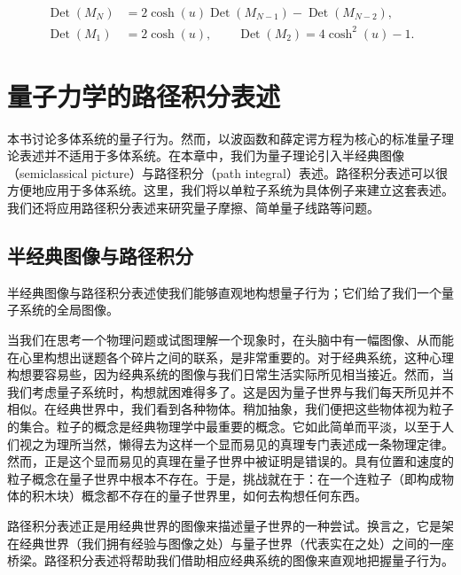 
\begin{align*}
\operatorname{Det}(M_N) &= 2\cosh(u)\operatorname{Det}(M_{N-1}) - \operatorname{Det}(M_{N-2}),\\
\operatorname{Det}(M_1) &= 2\cosh(u), \qquad \operatorname{Det}(M_2) = 4\cosh^2(u) - 1.
\end{align*}
\chapter{量子力学的路径积分表述}

本书讨论多体系统的量子行为。然而，以波函数和薛定谔方程为核心的标准量子理论表述并不适用于多体系统。在本章中，我们为量子理论引入半经典图像（semiclassical picture）与路径积分（path integral）表述。路径积分表述可以很方便地应用于多体系统。这里，我们将以单粒子系统为具体例子来建立这套表述。我们还将应用路径积分表述来研究量子摩擦、简单量子线路等问题。

\section{半经典图像与路径积分}

\begin{keypoints}
\item 半经典图像与路径积分表述使我们能够直观地构想量子行为；它们给了我们一个量子系统的全局图像。
\end{keypoints}

当我们在思考一个物理问题或试图理解一个现象时，在头脑中有一幅图像、从而能在心里构想出谜题各个碎片之间的联系，是非常重要的。对于经典系统，这种心理构想要容易些，因为经典系统的图像与我们日常生活实际所见相当接近。然而，当我们考虑量子系统时，构想就困难得多了。这是因为量子世界与我们每天所见并不相似。在经典世界中，我们看到各种物体。稍加抽象，我们便把这些物体视为粒子的集合。粒子的概念是经典物理学中最重要的概念。它如此简单而平淡，以至于人们视之为理所当然，懒得去为这样一个显而易见的真理专门表述成一条物理定律。然而，正是这个显而易见的真理在量子世界中被证明是错误的。具有位置和速度的粒子概念在量子世界中根本不存在。于是，挑战就在于：在一个连粒子（即构成物体的积木块）概念都不存在的量子世界里，如何去构想任何东西。

路径积分表述正是用经典世界的图像来描述量子世界的一种尝试。换言之，它是架在经典世界（我们拥有经验与图像之处）与量子世界（代表实在之处）之间的一座桥梁。路径积分表述将帮助我们借助相应经典系统的图像来直观地把握量子行为。

